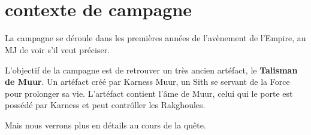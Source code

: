 \documentclass{jdrp}
\begin{document}
	\begin{titlepage}

	\begin{center}
		\hspace*{\vfill}
		\noindent\Huge{}\\ 
		\noindent\fontsize{50}{70}\jedifont{\$}
		\noindent\fontsize{50}{70}\jedifont{\#}\\
		\noindent\fontsize{50}{60}
		\hspace*{\vfill}
	\end{center}

	\hspace*{\vfill}

	\noindent{}

	\end{titlepage}

\section{contexte de campagne}
La campagne se déroule dans les premières années de l'avènement de l'Empire, au MJ de voir s'il veut préciser.

L'objectif de la campagne est de retrouver un très ancien artéfact, le \textbf{Talisman de Muur}. Un artéfact créé par Karness Muur, un Sith se servant de la Force pour prolonger sa vie. L'artéfact contient l'âme de Muur, celui qui le porte est possédé par Karness et peut contrôller les Rakghoules.

Mais nous verrons plus en détails au cours de la quête.

	

	\onecolumn
	\nocite{*}
	\printbibliography
\end{document}
